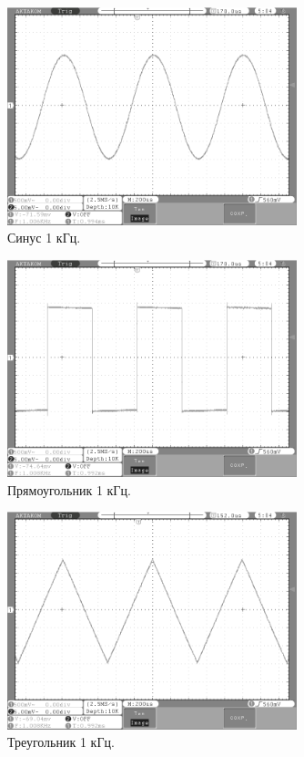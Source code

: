 	\begin{figure}[H]
    \centering
    \includegraphics[width=0.75\textwidth]{../image/sin1.bmp}
    \caption{Синус 1 кГц.}
	\end{figure}	
	
	\begin{figure}[H]
    \centering
    \includegraphics[width=0.75\textwidth]{../image/square1.bmp}
    \caption{Прямоугольник 1 кГц.}
	\end{figure}	
	
	\begin{figure}[H]
    \centering
    \includegraphics[width=0.75\textwidth]{../image/triangle1.bmp}
    \caption{Треугольник 1 кГц.}
	\end{figure}	

